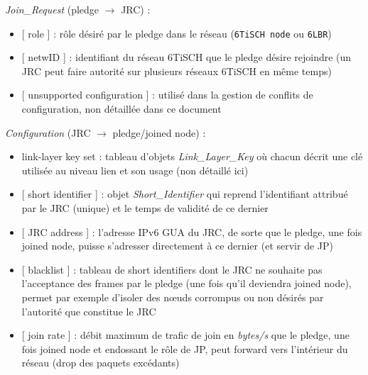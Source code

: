 \documentclass[]{report}
\begin{document}
\vspace{0.2cm}
\noindent\textit{Join\_Request} (pledge $\rightarrow$ JRC) : 
\begin{itemize}[label=$\bullet$]
\item {} [ role ] : rôle désiré par le pledge dans le réseau (\texttt{6TiSCH node} ou \texttt{6LBR})
\item {} [ netwID ] : identifiant du réseau 6TiSCH que le pledge désire rejoindre (un JRC peut faire autorité sur plusieurs réseaux 6TiSCH en même temps)
\item {} [ unsupported configuration ] : utilisé dans la gestion de conflits de configuration, non détaillée dans ce document
\end{itemize}

\vspace{0.3cm}
\noindent\textit{Configuration} (JRC $\rightarrow$ pledge/joined node) : 
\begin{itemize}[label=$\bullet$]
\item link-layer key set : tableau d'objets \textit{Link\_Layer\_Key} où chacun décrit une clé utilisée au niveau lien et son usage (non détaillé ici)
\item {} [ short identifier ] : objet \textit{Short\_Identifier} qui reprend l'identifiant attribué par le JRC (unique) et le temps de validité de ce dernier
\item {} [ JRC address ] : l'adresse IPv6 GUA du JRC, de sorte que le pledge, une fois joined node, puisse s'adresser directement à ce dernier (et servir de JP)
\item {} [ blacklist ] : tableau de short identifiers dont le JRC ne souhaite pas l'acceptance des frames par le pledge (une fois qu'il deviendra joined node), permet par exemple d'isoler des nœuds corrompus ou non désirés par l'autorité que constitue le JRC
\item {} [ join rate ] : débit maximum de trafic de join en \textit{bytes/s} que le pledge, une fois joined node et endossant le rôle de JP, peut forward vers l'intérieur du réseau (drop des paquets excédants)
\end{itemize}

\newpage
\end{document}
